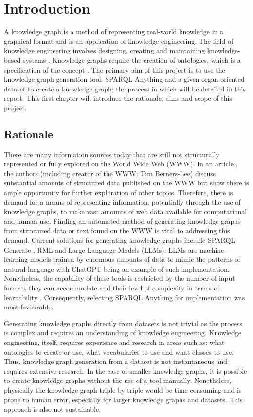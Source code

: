 \chapter{Introduction}
A knowledge graph is a method of representing real-world knowledge in a graphical format and is an application of knowledge engineering. The field of knowledge engineering involves designing, creating and maintaining knowledge-based systems \cite{studer_benjamins_fensel_1998}. Knowledge graphs require the creation of ontologies, which is a specification of the concept \cite{Breitman2007}. The primary aim of this project is to use the knowledge graph generation tool: SPARQL Anything and a given organ-oriented dataset to create a knowledge graph; the process in which will be detailed in this report. This first chapter will introduce the rationale, aims and scope of this project. 

\section{Rationale}
\hspace{0.5cm} There are many information sources today that are still not structurally represented or fully explored on the World Wide Web (WWW). In an article \cite{bizer2011linked}, the authors (including creator of the WWW: Tim Berners-Lee) discuss substantial amounts of structured data published on the WWW but show there is ample opportunity for further exploration of other topics. Therefore, there is demand for a means of representing information, potentially through the use of knowledge graphs, to make vast amounts of web data available for computational and human use. Finding an automated method of generating knowledge graphs from structured data or text found on the WWW is vital to addressing this demand. Current solutions for generating knowledge graphs include SPARQL-Generate \cite{sparqlgenerate}, RML \cite{rml} and Large Language Models (LLMs). LLMs are machine-learning models trained by enormous amounts of data to mimic the patterns of natural language with ChatGPT \cite{chatgptwebsite} being an example of such implementation. Nonetheless, the capability of these tools is restricted by the number of input formats they can accommodate and their level of complexity in terms of learnability \cite{sparqlanything}. Consequently, selecting SPARQL Anything \cite{sparqlanythinggithub} for implementation was most favourable. 

Generating knowledge graphs directly from datasets is not trivial as the process is complex and requires an understanding of knowledge engineering. Knowledge engineering, itself, requires experience and research in areas such as: what ontologies to create or use, what vocabularies to use and what classes to use. Thus, knowledge graph generation from a dataset is not instantaneous and requires extensive research. In the case of smaller knowledge graphs, it is possible to create knowledge graphs without the use of a tool manually. Nonetheless, physically the knowledge graph triple by triple would be time-consuming and is prone to human error, especially for larger knowledge graphs and datasets. This approach is also not sustainable. 


